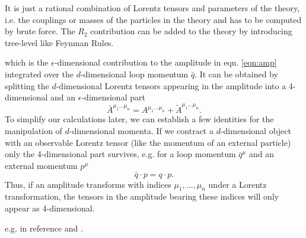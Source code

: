 It is just a rational combination of Lorentz tensors and parameters of the theory, i.e. the couplings or masses of the particles in the theory and has to be computed by brute force. The $R_2$ contribution can be added to the theory by introducing tree-level like Feynman Rules.


which is the $\epsilon$-dimensional contribution to the amplitude in eqn. \ref{eqn:amp} integrated over the $d$-dimensional loop momentum $\bar{q}$. It can be obtained by splitting the $d$-dimensional Lorentz tensors appearing in the amplitude into a 4-dimensional and an $\epsilon$-dimensional part
\begin{equation}
\bar{A}^{\mu_1\dots\mu_n} = A^{\mu_1\dots\mu_n} + \tilde{A}^{\mu_1\dots\mu_n}.
\end{equation}
To simplify our calculations later, we can establish a few identities for the manipulation of $d$-dimensional momenta. If we contract a $d$-dimensional object with an observable Lorentz tensor (like the momentum of an external particle) only the 4-dimensional part survives, e.g. for a loop momentum $\bar{q}^{\mu}$ and an external momentum $p^{\mu}$
\begin{equation}
\bar{q}\cdot p = q \cdot p.
\end{equation}
Thus, if an amplitude transforms with indices $\mu_1,\dots,\mu_n$ under a Lorentz transformation, the tensors in the amplitude bearing these indices will only appear as 4-dimensional.

e.g. in reference \cite{R2QCD} and \cite{R2QED}.

